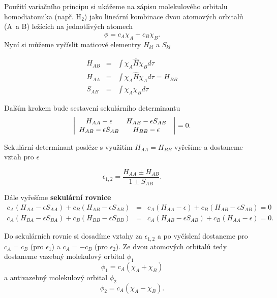 \begin{priklad}
\label{priklad var princip}
Použití variačního principu si ukážeme na zápisu molekulového orbitalu homodiatomika (např. H$_{2}$) jako lineární kombinace dvou atomových orbitalů (A~a B) ležících na jednotlivých atomech
\begin{displaymath} 
\phi = c_A\chi_A+c_B\chi_B.    
\end{displaymath}
Nyní si můžeme vyčíslit maticové elementry $H_{kl}$ a $S_{kl}$

\begin{eqnarray}
H_{AB}&=&\int \chi_A\hat{H}\chi_Bd\tau\nonumber\\
H_{AA}&=&\int \chi_A\hat{H}\chi_Ad\tau=H_{BB}\nonumber\\
S_{AB}&=&\int \chi_A \chi_B d\nonumber\tau
\end{eqnarray}   

Dalším krokem bude sestavení sekulárního determinantu
 \begin{displaymath}
    \left|\begin{array}{cc@{\quad}r}
     H_{AA} -\epsilon & H_{AB}-\epsilon S_{AB}  \\
     H_{AB} -\epsilon S_{AB} & H_{BB}-\epsilon  \\
    \end{array}\right |=0.
    \end{displaymath}

Sekulární determinant posléze s využitím $H_{AA} = H_{BB}$ vyřešíme a dostaneme vztah pro $\epsilon$

\begin{displaymath}
\epsilon_{1,2}=\frac{H_{AA}\pm H_{AB}}{1\pm S_{AB}}.
\end{displaymath}

Dále vyřešíme \textbf{sekulární rovnice}
\begin{eqnarray}
c_A(H_{AA}-\epsilon S_{AA})+c_B(H_{AB}-\epsilon S_{AB})&=&
c_A(H_{AA}-\epsilon)+c_B(H_{AB}-\epsilon S_{AB})=0\nonumber\\
c_A(H_{BA}-\epsilon S_{BA})+c_B(H_{BB}-\epsilon S_{BB})&=&
c_A(H_{AB}-\epsilon S_{AB})+c_B(H_{AA}-\epsilon)=0.\nonumber
\end{eqnarray}

Do sekulárních rovnic si dosadíme vztahy za $ \epsilon_{1,2} $
a po vyčíslení dostaneme pro  $c_A=c_B$ (pro $ \epsilon_1 $) a $c_A=-c_B$ (pro $ \epsilon_2 $). Ze dvou atomových orbitalů tedy dostaneme vazebný molekulový orbital $ \phi_1 $
\begin{displaymath}
\phi_1=c_A(\chi_A+\chi_B)
\end{displaymath}
a antivazebný molekulový orbital $ \phi_2 $
\begin{displaymath}
\phi_2=c_A(\chi_A-\chi_B).
\end{displaymath} \vspace{-0.9cm}
\end{priklad}
 
